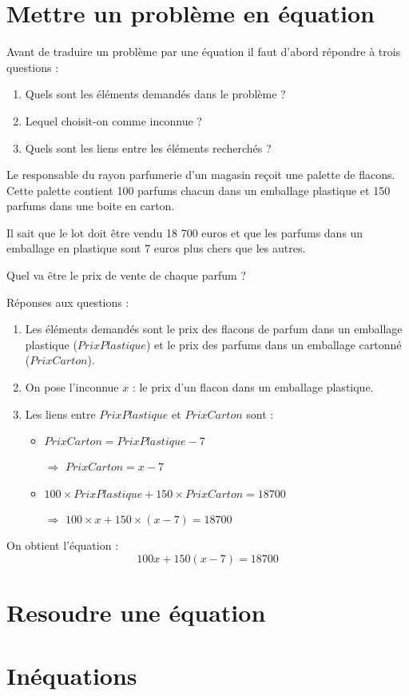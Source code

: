 \documentclass[12pt,a4paper]{article}
\begin{document}
\section{Mettre un problème en équation}

\begin{mymeth}
	Avant de traduire un problème par une équation il faut d'abord répondre à trois questions :
	\begin{enumerate}
		\item Quels sont les éléments demandés dans le problème ?
		\item Lequel choisit-on comme inconnue ?
		\item Quels sont les liens entre les éléments recherchés ?
	\end{enumerate}
\end{mymeth}

\begin{myact}{5}
	Le responsable du rayon parfumerie d’un magasin reçoit une palette de flacons. Cette palette contient 100 parfums chacun dans un emballage plastique et 150 parfums dans une boite en carton. 
	
	Il sait que le lot doit être vendu 18 700 euros et que les parfums dans un emballage en plastique sont 7 euros plus chers que les autres.
	 
	Quel va être le prix de vente de chaque parfum ?
	
\end{myact}

\begin{myrep}
	Réponses aux questions :
	\begin{enumerate}
		\item Les éléments demandés sont le prix des flacons de parfum dans un emballage plastique ($PrixPlastique$) et le prix des parfums dans un emballage cartonné ($PrixCarton$).
		\item On pose l'inconnue $x$ : le prix d'un flacon dans un emballage plastique.
		\item Les liens entre $PrixPlastique$ et $PrixCarton$ sont :
			\begin{itemize}
				\item $PrixCarton = PrixPlastique - 7$
				\item[$\Rightarrow$] $PrixCarton = x - 7$
				\item $100 \times PrixPlastique + 150 \times PrixCarton = 18700$
				\item[$\Rightarrow$] $100 \times x + 150 \times (x - 7) = 18700$ 
			\end{itemize}
	\end{enumerate}
	
	On obtient l'équation :
	\begin{equation*}
		100x + 150(x-7) = 18700
	\end{equation*}
\end{myrep}

\section{Resoudre une équation}
\section{Inéquations}
\end{document}
